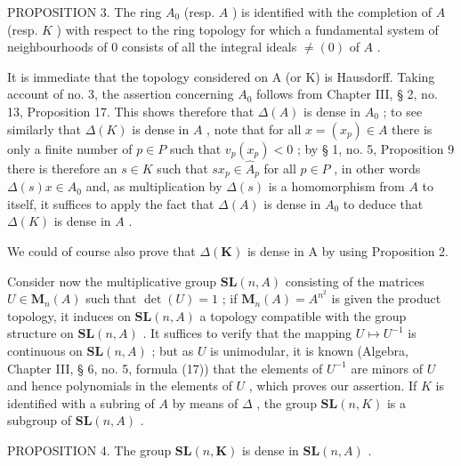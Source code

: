 PROPOSITION 3. The ring \(A_0\) (resp. \(A\) ) is identified with the completion of \(A\) (resp. \(K\) ) with respect to the ring topology for which a fundamental system of neighbourhoods of 0 consists of all the integral ideals \(\neq (0)\) of \(A\) .

It is immediate that the topology considered on A (or K) is Hausdorff. Taking account of no. 3, the assertion concerning \(A_{0}\) follows from Chapter III, § 2, no. 13, Proposition 17. This shows therefore that \(\Delta(A)\) is dense in \(A_{0}\) ; to see similarly that \(\Delta(K)\) is dense in \(A\) , note that for all \(x = (x_{p}) \in A\) there is only a finite number of \(p \in P\) such that \(v_{p}(x_{p}) < 0\) ; by § 1, no. 5, Proposition 9 there is therefore an \(s \in K\) such that \(sx_{p} \in \hat{A}_{p}\) for all \(p \in P\) , in other words \(\Delta(s)x \in A_{0}\) and, as multiplication by \(\Delta(s)\) is a homomorphism from \(A\) to itself, it suffices to apply the fact that \(\Delta(A)\) is dense in \(A_{0}\) to deduce that \(\Delta(K)\) is dense in \(A\) .

We could of course also prove that \(\Delta(\mathbf{K})\) is dense in A by using Proposition 2.

Consider now the multiplicative group \(\mathbf{SL}(n, A)\) consisting of the matrices \(U \in \mathbf{M}_n(A)\) such that \(\det(U) = 1\) ; if \(\mathbf{M}_n(A) = A^{n^2}\) is given the product topology, it induces on \(\mathbf{SL}(n, A)\) a topology compatible with the group structure on \(\mathbf{SL}(n, A)\) . It suffices to verify that the mapping \(U \mapsto U^{-1}\) is continuous on \(\mathbf{SL}(n, A)\) ; but as \(U\) is unimodular, it is known (Algebra, Chapter III, § 6, no. 5, formula (17)) that the elements of \(U^{-1}\) are minors of \(U\) and hence polynomials in the elements of \(U\) , which proves our assertion. If \(K\) is identified with a subring of \(A\) by means of \(\Delta\) , the group \(\mathbf{SL}(n, K)\) is a subgroup of \(\mathbf{SL}(n, A)\) .

PROPOSITION 4. The group \(\mathbf{SL}(n, \mathbf{K})\) is dense in \(\mathbf{SL}(n, A)\) .

